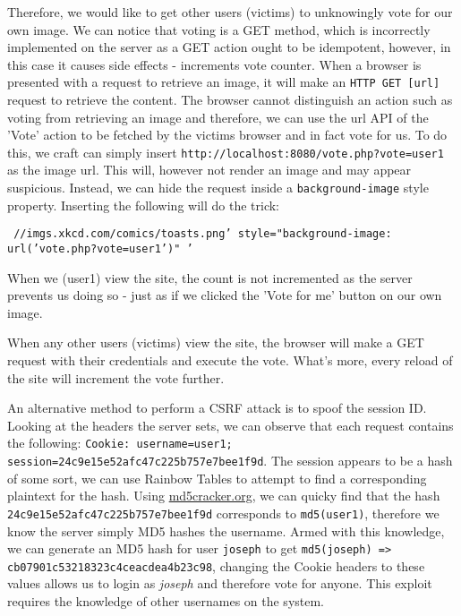 \documentclass[a4paper, 12pt]{article}
\begin{document}
Therefore, we would like to get other users (victims) to unknowingly vote for our own image. We can notice that voting is a GET method, which is incorrectly implemented on the server as a GET action ought to be idempotent, however, in this case it causes side effects - increments vote counter. When a browser is presented with a request to retrieve an image, it will make an \texttt{HTTP GET [url]} request to retrieve the content. The browser cannot distinguish an action such as voting from retrieving an image and therefore, we can use the url API of the 'Vote' action to be fetched by the victims browser and in fact vote for us. To do this, we craft can simply insert \texttt{http://localhost:8080/vote.php?vote=user1} as the image url. This will, however not render an image and may appear suspicious. Instead, we can hide the request inside a \texttt{background-image} style property. Inserting the following will do the trick:

\texttt{
\newline //imgs.xkcd.com/comics/toasts.png'
\newline style="background-image: url('vote.php?vote=user1')" '}

When we (user1) view the site, the count is not incremented as the server prevents us doing so - just as if we clicked the 'Vote for me' button on our own image.

When any other users (victims) view the site, the browser will make a GET request with their credentials and execute the vote. What's more, every reload of the site will increment the vote further.

An alternative method to perform a CSRF attack is to spoof the session ID. Looking at the headers the server sets, we can observe that each request contains the following:
\texttt{Cookie: username=user1; session=24c9e15e52afc47c225b757e7bee1f9d}. The session appears to be a hash of some sort, we can use Rainbow Tables to attempt to find a corresponding plaintext for the hash. Using \url{md5cracker.org}, we can quicky find that the hash \texttt{24c9e15e52afc47c225b757e7bee1f9d} corresponds to \texttt{md5(user1)}, therefore we know the server simply MD5 hashes the username. Armed with this knowledge, we can generate an MD5 hash for user \texttt{joseph} to get \texttt{\newline md5(joseph) => cb07901c53218323c4ceacdea4b23c98}, changing the Cookie headers to these values allows us to login as \textit{joseph} and therefore vote for anyone. This exploit requires the knowledge of other usernames on the system.
\end{document}
